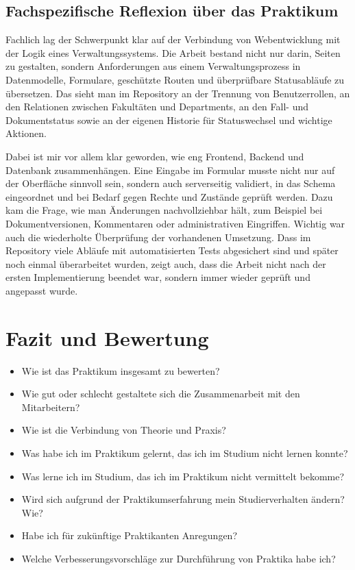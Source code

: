 ﻿\documentclass{Vorlage}
\begin{document}
\subsection{Fachspezifische Reflexion über das Praktikum}

Fachlich lag der Schwerpunkt klar auf der Verbindung von Webentwicklung mit der Logik eines Verwaltungssystems. Die Arbeit bestand nicht nur darin, Seiten zu gestalten, sondern Anforderungen aus einem Verwaltungsprozess in Datenmodelle, Formulare, geschützte Routen und überprüfbare Statusabläufe zu übersetzen. Das sieht man im Repository an der Trennung von Benutzerrollen, an den Relationen zwischen Fakultäten und Departments, an den Fall- und Dokumentstatus sowie an der eigenen Historie für Statuswechsel und wichtige Aktionen.

Dabei ist mir vor allem klar geworden, wie eng Frontend, Backend und Datenbank zusammenhängen. Eine Eingabe im Formular musste nicht nur auf der Oberfläche sinnvoll sein, sondern auch serverseitig validiert, in das Schema eingeordnet und bei Bedarf gegen Rechte und Zustände geprüft werden. Dazu kam die Frage, wie man Änderungen nachvollziehbar hält, zum Beispiel bei Dokumentversionen, Kommentaren oder administrativen Eingriffen. Wichtig war auch die wiederholte Überprüfung der vorhandenen Umsetzung. Dass im Repository viele Abläufe mit automatisierten Tests abgesichert sind und später noch einmal überarbeitet wurden, zeigt auch, dass die Arbeit nicht nach der ersten Implementierung beendet war, sondern immer wieder geprüft und angepasst wurde.


\renewcommand{\thesection}{\Roman{section}}

\section{Fazit und Bewertung}

\begin{itemize}

\item Wie ist das Praktikum insgesamt zu bewerten?

\item Wie gut oder schlecht gestaltete sich die Zusammenarbeit mit den Mitarbeitern?

\item Wie ist die Verbindung von Theorie und Praxis?

\item Was habe ich im Praktikum gelernt, das ich im Studium nicht lernen konnte?

\item Was lerne ich im Studium, das ich im Praktikum nicht vermittelt bekomme?

\item Wird sich aufgrund der Praktikumserfahrung mein Studierverhalten ändern? Wie?

\item Habe ich für zukünftige Praktikanten Anregungen?

\item Welche Verbesserungsvorschläge zur Durchführung von Praktika habe ich?

\end{itemize}
\end{document}
